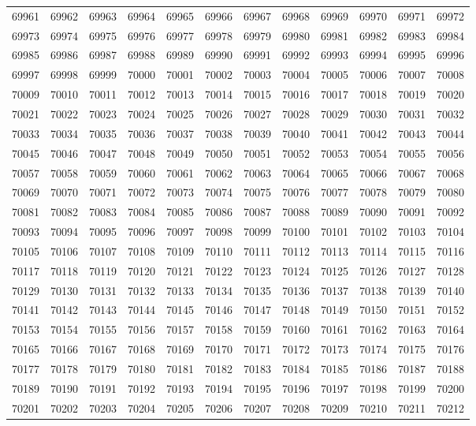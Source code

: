 \begin{center}
\begin{longtable}{llllllllllll}
69961 &69962 &69963 &69964 &69965 &69966 &69967 &69968 &69969 &69970 &69971 &69972 \\
69973 &69974 &69975 &69976 &69977 &69978 &69979 &69980 &69981 &69982 &69983 &69984 \\
69985 &69986 &69987 &69988 &69989 &69990 &69991 &69992 &69993 &69994 &69995 &69996 \\
69997 &69998 &69999 &70000 &70001 &70002 &70003 &70004 &70005 &70006 &70007 &70008 \\
70009 &70010 &70011 &70012 &70013 &70014 &70015 &70016 &70017 &70018 &70019 &70020 \\
70021 &70022 &70023 &70024 &70025 &70026 &70027 &70028 &70029 &70030 &70031 &70032 \\
70033 &70034 &70035 &70036 &70037 &70038 &70039 &70040 &70041 &70042 &70043 &70044 \\
70045 &70046 &70047 &70048 &70049 &70050 &70051 &70052 &70053 &70054 &70055 &70056 \\
70057 &70058 &70059 &70060 &70061 &70062 &70063 &70064 &70065 &70066 &70067 &70068 \\
70069 &70070 &70071 &70072 &70073 &70074 &70075 &70076 &70077 &70078 &70079 &70080 \\
70081 &70082 &70083 &70084 &70085 &70086 &70087 &70088 &70089 &70090 &70091 &70092 \\
70093 &70094 &70095 &70096 &70097 &70098 &70099 &70100 &70101 &70102 &70103 &70104 \\
70105 &70106 &70107 &70108 &70109 &70110 &70111 &70112 &70113 &70114 &70115 &70116 \\
70117 &70118 &70119 &70120 &70121 &70122 &70123 &70124 &70125 &70126 &70127 &70128 \\
70129 &70130 &70131 &70132 &70133 &70134 &70135 &70136 &70137 &70138 &70139 &70140 \\
70141 &70142 &70143 &70144 &70145 &70146 &70147 &70148 &70149 &70150 &70151 &70152 \\
70153 &70154 &70155 &70156 &70157 &70158 &70159 &70160 &70161 &70162 &70163 &70164 \\
70165 &70166 &70167 &70168 &70169 &70170 &70171 &70172 &70173 &70174 &70175 &70176 \\
70177 &70178 &70179 &70180 &70181 &70182 &70183 &70184 &70185 &70186 &70187 &70188 \\
70189 &70190 &70191 &70192 &70193 &70194 &70195 &70196 &70197 &70198 &70199 &70200 \\
70201 &70202 &70203 &70204 &70205 &70206 &70207 &70208 &70209 &70210 &70211 &70212 \\

\end{longtable}
\end{center}
